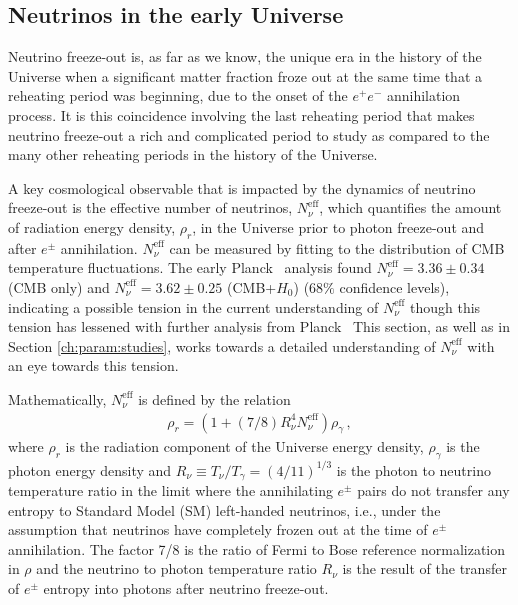 \subsection{Neutrinos in the early Universe}
\label{sec:model:ind}

Neutrino freeze-out is, as far as we know, the unique era in the history of the Universe when a significant matter fraction froze out at the same time that a reheating period was beginning, due to the onset of the $e^+e^-$ annihilation process. It is this coincidence involving the last reheating period that makes neutrino freeze-out a rich and complicated period to study as compared to the many other reheating periods in the history of the Universe.

A key cosmological observable that is impacted by the dynamics of neutrino freeze-out is the effective number of neutrinos, $N^{\text{eff}}_\nu$, which quantifies the amount of radiation energy density, $\rho_r$, in the Universe prior to photon freeze-out and after $e^\pm$ annihilation. $N^{\text{eff}}_\nu$  can be measured by fitting to the distribution of CMB temperature fluctuations. The early Planck~\cite{Planck:2013pxb} analysis found $N^{\text{eff}}_{\nu}=3.36\pm 0.34$ (CMB only) and $N^{\text{eff}}_{\nu}=3.62\pm 0.25$ (CMB+$H_0$) ($68\%$ confidence levels), indicating a possible tension in the current understanding of $N^{\text{eff}}_\nu$ though this tension has lessened with further analysis from Planck~\cite{Planck:2015fie,Planck:2018vyg} This section, as well as in Section \ref{ch:param:studies}, works towards a detailed understanding of $N^{\text{eff}}_{\nu}$ with an eye towards this tension.

Mathematically, $N^{\text{eff}}_\nu$ is defined by the relation
\begin{align}\label{eq:NeffDef}
\rho_r=\left(1+(7/8)R_\nu^{4}N^{\text{eff}}_\nu\right)\rho_\gamma\,,
\end{align}
where $\rho_r$ is the radiation component of the Universe energy density, $\rho_\gamma$ is the photon energy density and $R_\nu\equiv T_\nu/T_\gamma=({4}/{11})^{1/3}$ is the photon to neutrino temperature ratio in the limit where the annihilating $e^\pm$ pairs do not transfer any entropy to Standard Model (SM) left-handed neutrinos, i.e., under the assumption that neutrinos have completely frozen out at the time of $e^\pm$ annihilation. The factor 7/8 is the ratio of Fermi to Bose reference normalization in $\rho$ and the neutrino to photon temperature ratio $R_\nu$ is the result of the transfer of $e^\pm$ entropy into photons after neutrino freeze-out. 

